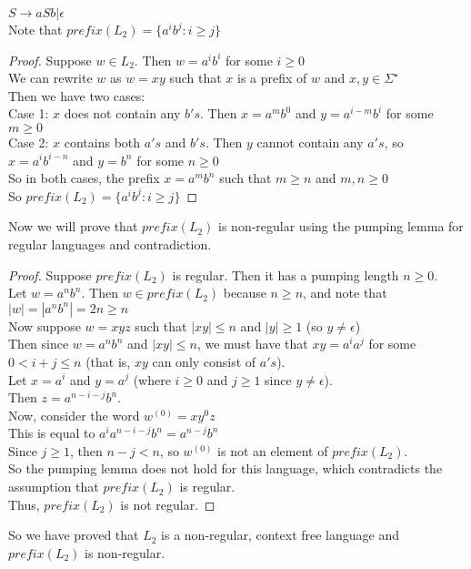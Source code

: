 \documentclass{article}
\begin{document}
$S \rightarrow aSb|\epsilon$\\ 
Note that $prefix(L_2) = \{a^ib^j: i \ge j \}$
\begin{proof}
Suppose $w \in L_2$. Then $w = a^ib^i$ for some $i \ge 0$\\
We can rewrite $w$ as $w = xy$ such that $x$ is a prefix of $w$ and $x, y \in \Sigma^\star$\\
Then we have two cases:\\
Case 1: $x$ does not contain any $b's$. Then $x = a^mb^0$ and $y = a^{i-m}b^i$ for some $m \ge 0$\\
Case 2: $x$ contains both $a's$ and $b's$. Then $y$ cannot contain any $a's$, so $x = a^ib^{i-n}$ and $y = b^n$ for some $n \ge 0$\\
So in both cases, the prefix $x = a^mb^n$ such that $m \ge n$ and $m, n \ge 0$\\
So $prefix(L_2) = \{a^ib^j: i \ge j \}$
\end{proof}
Now we will prove that $prefix(L_2)$ is non-regular using the pumping lemma for regular languages and contradiction.
\begin{proof}
Suppose $prefix(L_2)$ is regular. Then it has a pumping length $n \ge 0$.\\
Let $w = a^nb^n$. Then $w \in prefix(L_2)$ because $n \ge n$, and note that $|w| = |a^nb^n| = 2n \ge n$\\
Now suppose $w = xyz$ such that $|xy| \le n$ and $|y| \ge 1$ (so $y \neq \epsilon$) \\
Then since $w = a^nb^n$ and $|xy| \le n$, we must have that $xy = a^ia^j$ for some $0 < i+j \le n$ (that is, $xy$ can only consist of $a's$).\\
Let $x = a^i$ and $y = a^j$ (where $i \ge 0$ and $j \ge 1$ since $y \neq \epsilon$).\\
Then $z = a^{n-i-j}b^n$.\\
Now, consider the word $w^{(0)} = xy^0z$\\
This is equal to $a^ia^{n-i-j}b^n = a^{n-j}b^n$\\
Since $j \ge 1$, then $n-j < n$, so $w^{(0)}$ is not an element of $prefix(L_2)$.\\
So the pumping lemma does not hold for this language, which contradicts the assumption that $prefix(L_2)$ is regular.\\
Thus, $prefix(L_2)$ is not regular.
\end{proof}

So we have proved that $L_2$ is a non-regular, context free language and $prefix(L_2)$ is non-regular.
\end{document}
